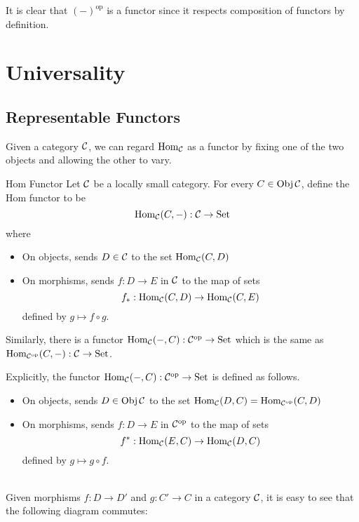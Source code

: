 \documentclass[a4paper]{article}
\begin{document}
It is clear that $(-)^\text{op}$ is a functor since it respects composition of functors by definition. 

\pagebreak
\section{Universality}
\subsection{Representable Functors}
Given a category $\mathcal{C}$, we can regard $\operatorname{Hom}_{\mathcal{C}}$ as a functor by fixing one of the two objects and allowing the other to vary. 

\begin{defn}{Hom Functor}{} Let $\mathcal{C}$ be a locally small category. For every $C\in\operatorname{Obj}\mathcal{C}$, define the Hom functor to be $$\operatorname{Hom}_{\mathcal{C}}(C,-):\mathcal{C}\to\text{Set}$$ where 
\begin{itemize}
\item On objects, sends $D\in\mathcal{C}$ to the set $\operatorname{Hom}_{\mathcal{C}}(C,D)$
\item On morphisms, sends $f:D\to E$ in $\mathcal{C}$ to the map of sets $$f_\ast:\operatorname{Hom}_{\mathcal{C}}(C,D)\to\operatorname{Hom}_{\mathcal{C}}(C,E)$$ defined by $g\mapsto f\circ g$. 
\end{itemize}
Similarly, there is a functor $\operatorname{Hom}_{\mathcal{C}}(-,C):\mathcal{C}^{\text{op}}\to\text{Set}$ which is the same as $\operatorname{Hom}_{\mathcal{C}^{\text{op}}}(C,-):\mathcal{C}\to\text{Set}$. 
\end{defn}

Explicitly, the functor $\operatorname{Hom}_{\mathcal{C}}(-,C):\mathcal{C}^{\text{op}}\to\text{Set}$ is defined as follows. 
\begin{itemize}
\item On objects, sends $D\in\operatorname{Obj}\mathcal{C}$ to the set $\operatorname{Hom}_{\mathcal{C}}(D,C)=\operatorname{Hom}_{\mathcal{C}^{\text{op}}}(C,D)$
\item On morphisms, sends $f:D\to E$ in $\mathcal{C}^{\text{op}}$ to the map of sets $$f^\ast:\operatorname{Hom}_{\mathcal{C}}(E,C)\to\operatorname{Hom}_{\mathcal{C}}(D,C)$$ defined by $g\mapsto g\circ f$. 
\end{itemize}~\\

Given morphisms $f:D\to D'$ and $g:C'\to C$ in a category $\mathcal{C}$, it is easy to see that the following diagram commutes: \\~\\
\\~\\
\end{document}
